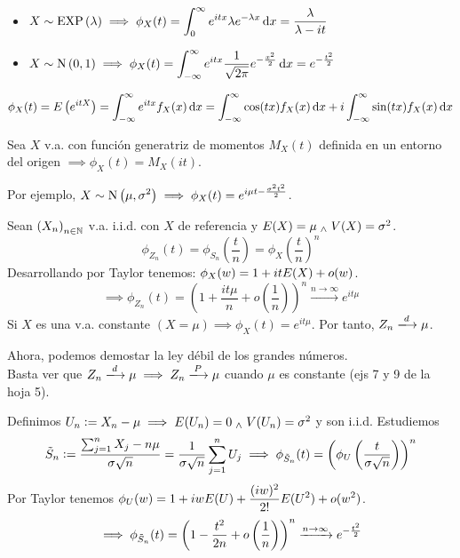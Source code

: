 \begin{ejem}
	\begin{itemize} %
		\item $\ds X\sim\EXP{\lambda} \implies \phi_X(t) = \int_{0}^{\infty} e^{itx}\lambda e^{-\lambda x}\odif{x} = \frac{\lambda}{\lambda - it}$
		\item $\ds X\sim\normal{0,1} \implies \phi_X(t) = \int_{-\infty}^{\infty} e^{itx}\frac{1}{\sqrt{2\pi}}e^{-\frac{x^2}{2}}\odif{x} = e^{-\frac{t^2}{2}}$
	\end{itemize}
\end{ejem}


\[\phi_X(t) = E\left(e^{itX}\right) = \int_{-\infty}^{\infty} e^{itx}f_X(x)\odif{x} = \int_{-\infty}^{\infty} \cos(tx)f_X(x)\odif{x} + i\int_{-\infty}^{\infty} \sin(tx)f_X(x)\odif{x}\]

\begin{teo}
	Sea $X$ v.a. con función generatriz de momentos $M_X(t)$ definida en un entorno del origen $\implies \phi_X(t) = M_X(it)$.
\end{teo}

Por ejemplo, $\displaystyle X \sim \operatorname{N}\left(\mu, \sigma^2\right) \implies \phi_X(t) = e^{i\mu t - \frac{\sigma^2t^2}{2}}$.

\begin{dem}
	Sean $\left(X_n\right)_{n\in \mathbb{N}}$ v.a. i.i.d. con $X$ de referencia y $E(X) = \mu \; _{\wedge} \; V(X) = \sigma^2$.
	\[\phi_{Z_n}(t) = \phi_{S_n}\left(\frac{t}{n}\right) = \phi_X\left(\frac{t}{n}\right)^n\]
	Desarrollando por Taylor tenemos: $\displaystyle \phi_X(w) = 1 + it E(X) + o(w)$.
	\[\implies \phi_{Z_n}(t) = \left(1 + \frac{it\mu}{n} + o\left(\frac{1}{n}\right)\right)^n \xrightarrow{n\to\infty} e^{it\mu}\]
	Si $X$ es una v.a. constante $(X=\mu) \implies \phi_X(t) = e^{it\mu}$. Por tanto, $Z_n \xlongrightarrow{d} \mu$.

	Ahora, podemos demostar la ley débil de los grandes números.\\
	Basta ver que $Z_n \xlongrightarrow{d} \mu \implies Z_n \xlongrightarrow{P} \mu$ cuando $\mu$ es constante (ejs 7 y 9 de la hoja 5).

	Definimos $U_n \vcentcolon= X_n - \mu \implies E(U_n) = 0 \; _{\wedge} \; V(U_n) = \sigma^2$ y son i.i.d. Estudiemos
	\[ \tilde{S}_n \vcentcolon= \frac{\sum_{j=1}^n X_j - n\mu}{\sigma \sqrt{n}} = \frac{1}{\sigma\sqrt{n}}\sum_{j=1}^n U_j \implies \phi_{\tilde{S}_n}(t) = \left(\phi_U\left(\frac{t}{\sigma\sqrt{n}}\right)\right)^n\]
	Por Taylor tenemos $\displaystyle \phi_U(w) = 1 + iw E(U) + \frac{(iw)^2}{2!}E(U^2) + o(w^2) $.
	\[\implies \phi_{\tilde{S}_n}(t) = \left(1 - \frac{t^2}{2n} + o\left(\frac{1}{n}\right)\right)^n \xrightarrow{n\to\infty} e^{-\frac{t^2}{2}}\]
\end{dem}

